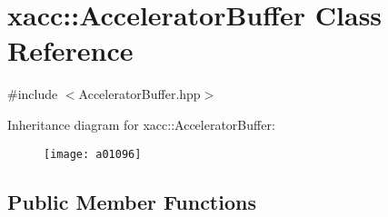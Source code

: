 \hypertarget{a01096}{}\section{xacc\+:\+:Accelerator\+Buffer Class Reference}
\label{a01096}


{\ttfamily \#include $<$Accelerator\+Buffer.\+hpp$>$}

Inheritance diagram for xacc\+:\+:Accelerator\+Buffer\+:\begin{figure}[H]
\begin{center}
\leavevmode
\texttt{[image: a01096]}
\end{center}
\end{figure}
\subsection*{Public Member Functions}
